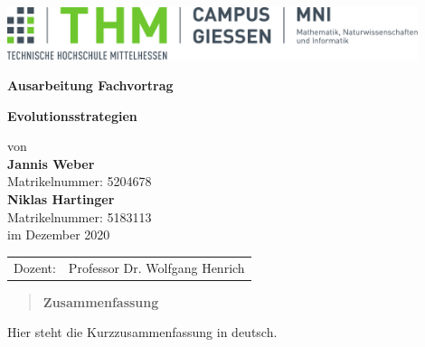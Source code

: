 \documentclass[%
	BCOR=8.25mm,         %
	DIV=12,              %
	parskip=half,				 %
	bibliography=totoc,	 %
	headsepline=on,      %
	cleardoublepage=plain %
	]{scrartcl}
\begin{document}

\begin{titlepage}
	\begin{center}
	\includegraphics[width=0.9\textwidth]{img/mni-logo}
	
	\vspace{3cm}	

	\Large\textbf{\sffamily Ausarbeitung Fachvortrag}

	\vspace{1cm}	

	\huge\textbf{\sffamily Evolutionsstrategien}

	\normalsize
	\vspace{1cm}

	von \\[1cm]	

	\LARGE\textbf{Jannis Weber}\\ [.5cm]\normalsize
	Matrikelnummer: 5204678\\ [.75cm]
	
	\LARGE\textbf{Niklas Hartinger}\\ [.5cm]\normalsize
	Matrikelnummer: 5183113\\ [.75cm]
	
	im Dezember 2020
	\end{center}
	\vfill
	\begin{tabular}{ll}
		Dozent: & Professor Dr. Wolfgang Henrich 
	\end{tabular}
\end{titlepage}

\pagestyle{entrypage}
\setcounter{page}{1}
\begin{quote}
	\vspace*{4cm}

	\begin{center}
		\textbf{\Large\sffamily Zusammenfassung}
	\end{center}
	\vspace*{.5cm}
	
\end{quote}

	Hier steht die Kurzzusammenfassung in deutsch.
	
{}
\cleardoublepage
\end{document}
